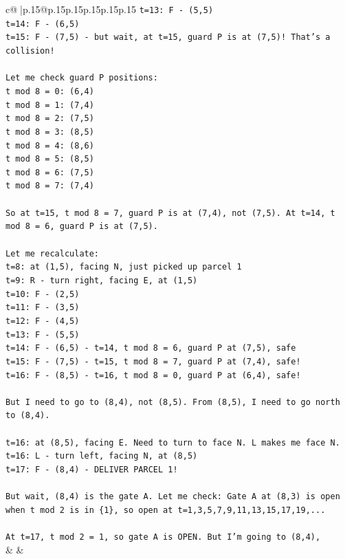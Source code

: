 \documentclass{article}
\begin{document}
{\begin{supertabular}{c@{$\;$}|p{.15\linewidth}@{}p{.15\linewidth}p{.15\linewidth}p{.15\linewidth}p{.15\linewidth}p{.15\linewidth}}
{{{\texttt{t=13: F {-} (5,5)} \\
\texttt{t=14: F {-} (6,5)} \\
\texttt{t=15: F {-} (7,5) {-} but wait, at t=15, guard P is at (7,5)! That's a collision!} \\
\\ 
\texttt{Let me check guard P positions:} \\
\texttt{t mod 8 = 0: (6,4)} \\
\texttt{t mod 8 = 1: (7,4)} \\
\texttt{t mod 8 = 2: (7,5)} \\
\texttt{t mod 8 = 3: (8,5)} \\
\texttt{t mod 8 = 4: (8,6)} \\
\texttt{t mod 8 = 5: (8,5)} \\
\texttt{t mod 8 = 6: (7,5)} \\
\texttt{t mod 8 = 7: (7,4)} \\
\\ 
\texttt{So at t=15, t mod 8 = 7, guard P is at (7,4), not (7,5). At t=14, t mod 8 = 6, guard P is at (7,5).} \\
\\ 
\texttt{Let me recalculate:} \\
\texttt{t=8: at (1,5), facing N, just picked up parcel 1} \\
\texttt{t=9: R {-} turn right, facing E, at (1,5)} \\
\texttt{t=10: F {-} (2,5)} \\
\texttt{t=11: F {-} (3,5)} \\
\texttt{t=12: F {-} (4,5)} \\
\texttt{t=13: F {-} (5,5)} \\
\texttt{t=14: F {-} (6,5) {-} t=14, t mod 8 = 6, guard P at (7,5), safe} \\
\texttt{t=15: F {-} (7,5) {-} t=15, t mod 8 = 7, guard P at (7,4), safe!} \\
\texttt{t=16: F {-} (8,5) {-} t=16, t mod 8 = 0, guard P at (6,4), safe!} \\
\\ 
\texttt{But I need to go to (8,4), not (8,5). From (8,5), I need to go north to (8,4).} \\
\\ 
\texttt{t=16: at (8,5), facing E. Need to turn to face N. L makes me face N.} \\
\texttt{t=16: L {-} turn left, facing N, at (8,5)} \\
\texttt{t=17: F {-} (8,4) {-} DELIVER PARCEL 1!} \\
\\ 
\texttt{But wait, (8,4) is the gate A. Let me check: Gate A at (8,3) is open when t mod 2 is in \{1\}, so open at t=1,3,5,7,9,11,13,15,17,19,...} \\
\\ 
\texttt{At t=17, t mod 2 = 1, so gate A is OPEN. But I'm going to (8,4),} \\
            }
        }
    }
    & & \\ \\


\end{supertabular}}
\end{document}
